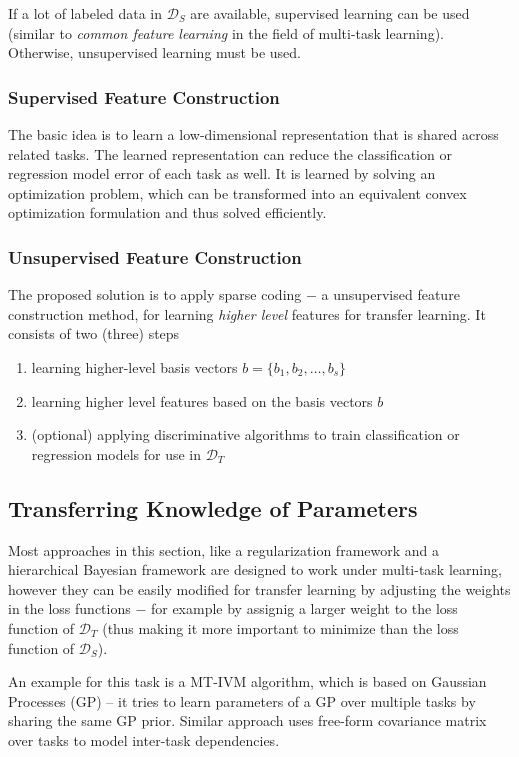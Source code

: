 \documentclass[a4paper,twocolumn]{article}
\newcommand{\D}{\mathcal{D}}
\begin{document}
If a lot of labeled data in $\D_S$ are available, supervised learning can be used (similar to \textit{common feature learning} in the field of multi-task learning).
Otherwise, unsupervised learning must be used.

\subsubsection{Supervised Feature Construction}
The basic idea is to learn a low-dimensional representation that is shared across related tasks. The learned representation can reduce the classification or regression model error of each task as well. It is learned by solving an optimization problem, which can be transformed into an equivalent convex optimization formulation and thus solved efficiently.
\subsubsection{Unsupervised Feature Construction}
The proposed solution is to apply sparse coding $-$ a unsupervised feature construction method, for learning \textit{higher level} features for transfer learning.
It consists of two (three) steps
\begin{enumerate}
    \item learning higher-level basis vectors $b = \{b_1, b_2, \ldots, b_s\}$
    \item learning higher level features based on the basis vectors $b$
    \item (optional) applying discriminative algorithms to train classification or regression models for use in $\D_T$
\end{enumerate}
\subsection{Transferring Knowledge of Parameters}
Most approaches in this section, like a regularization framework and a hierarchical Bayesian framework are designed to work under multi-task learning, however they can be easily modified for transfer learning by adjusting the weights in the loss functions $-$ for example by assignig a larger weight to the loss function of $\D_T$ (thus making it more important to minimize than the loss function of $\D_S$).

An example for this task is a MT-IVM algorithm, which is based on Gaussian Processes (GP) – it tries to learn parameters of a GP over multiple tasks by sharing the same GP prior.
Similar approach uses free-form covariance matrix over tasks to model inter-task dependencies.
\end{document}
